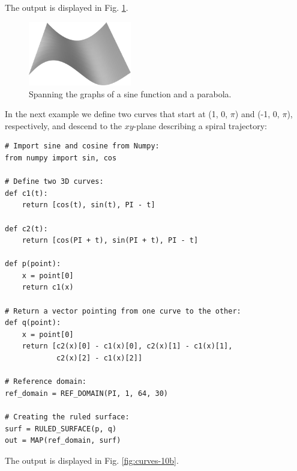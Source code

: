 \noindent
The output is displayed in Fig. \ref{fig:curves-10}.\\

\begin{figure}[!ht]
\begin{center}
\includegraphics[width=0.4\textwidth]{img/curves-10.png}
\end{center}
\vspace{-4mm}
\caption{Spanning the graphs of a sine function and a parabola.}
\label{fig:curves-10}
\end{figure}
\noindent
In the next example we define 
two curves that start at (1, 0, $\pi$) and (-1, 0, $\pi$), respectively,
and descend to the $xy$-plane describing a spiral trajectory:\\

\begin{bbox}
\begin{verbatim}
# Import sine and cosine from Numpy:
from numpy import sin, cos

# Define two 3D curves:
def c1(t):
    return [cos(t), sin(t), PI - t]

def c2(t):
    return [cos(PI + t), sin(PI + t), PI - t]
  
def p(point):
    x = point[0]
    return c1(x)
  
# Return a vector pointing from one curve to the other:
def q(point):
    x = point[0]
    return [c2(x)[0] - c1(x)[0], c2(x)[1] - c1(x)[1], 
            c2(x)[2] - c1(x)[2]]
  
# Reference domain:
ref_domain = REF_DOMAIN(PI, 1, 64, 30)

# Creating the ruled surface:
surf = RULED_SURFACE(p, q)
out = MAP(ref_domain, surf)
\end{verbatim}
\end{bbox}
\vspace{6mm}

\noindent
The output is displayed in Fig. \ref{fig:curves-10b}.\\

